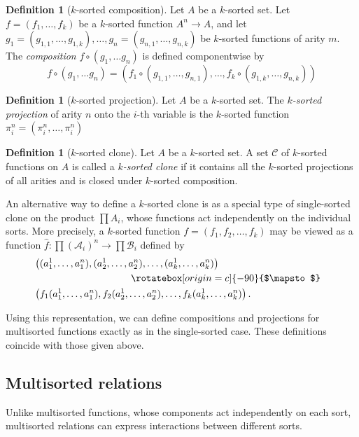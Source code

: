 \documentclass{amsart}
\numberwithin{equation}{section}
\theoremstyle{plain}
\theoremstyle{definition}
\newtheorem{definition}[theorem]{Definition}
\def\set#1{#1}
\def\clone#1{\mathcal{#1}}
\begin{document}
\begin{definition}[$k$-sorted composition]
Let $\set{A}$ be a $k$-sorted set. Let $f=(f_1,\dots,f_k)$ be a $k$-sorted function $\set{A}^n\to \set{A}$, and let $g_1=(g_{1,1},\dots,g_{1,k}),\dots,g_n=(g_{n,1},\dots,g_{n,k})$ be $k$-sorted functions of arity $m$. The {\em composition} $f\circ(g_1,\dots g_n)$ is defined componentwise by
$$f\circ(g_1,\dots g_n) = (f_1\circ (g_{1,1},\dots,g_{n,1}), \dots, f_k\circ (g_{1,k},\dots,g_{n,k}))$$ 
\end{definition}

\begin{definition}[$k$-sorted projection]
Let $\set{A}$ be a $k$-sorted set. The {\em $k$-sorted projection} of arity $n$ onto the $i$-th variable is the $k$-sorted function $\pi_i^n = (\pi_i^n,\dots ,\pi_i^n)$
\end{definition}

\begin{definition}[$k$-sorted clone]
Let $\set{A}$ be a $k$-sorted set. A set $\clone{C}$ of $k$-sorted functions on $\set{A}$ is called a {\it $k$-sorted clone} if it contains all the $k$-sorted projections of all arities and is closed under $k$-sorted composition.
\end{definition}

An alternative way to define a $k$-sorted clone is as a special type of single-sorted clone on the product $\prod \set{A}_i$, whose functions act independently on the individual sorts. More precisely, a $k$-sorted function $f=(f_1,f_2,\dots,f_k)$ may be viewed as a function $\hat{f}:\prod ({\mathcal A}_i)^n \to \prod {\mathcal B}_i$ defined by
\newcommand{\vmapsto}{\rotatebox[origin=c]{-90}{$\mapsto$}}
\begin{align*}
  &\left( (a^1_1, \dots, a^n_1), (a^1_2,\dots, a_2^n), \dots, (a_k^1, \dots, a_k^n)\right)\cr
  &\hskip3.5cm\vmapsto \cr
  &\left( f_1(a^1_1, \dots, a^n_1), f_2(a^1_2,\dots, a_2^n), \dots, f_k(a_k^1, \dots, a_k^n)\right) .
\end{align*}
 
Using this representation, we can define compositions and projections for multisorted functions exactly as in the single-sorted case. These definitions coincide with those given above.

\subsection{Multisorted relations}

Unlike multisorted functions, whose components act independently on each sort, multisorted relations can express interactions between different sorts.
\end{document}
